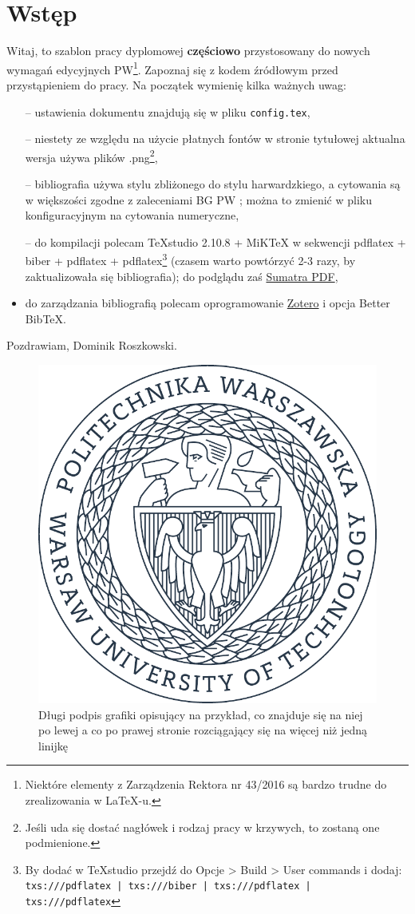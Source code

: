 \chapter{Wstęp}
Witaj, to szablon pracy dyplomowej \textbf{częściowo} przystosowany do nowych wymagań edycyjnych PW\footnote{Niektóre elementy z Zarządzenia Rektora nr 43/2016 są bardzo trudne do zrealizowania w \LaTeX-u.}. Zapoznaj się z kodem źródłowym przed przystąpieniem do pracy. Na początek wymienię kilka ważnych uwag:

\begin{itemize}
	\item[--] ustawienia dokumentu znajdują się w pliku \texttt{config.tex},
	\item[--] niestety ze względu na użycie płatnych fontów w stronie tytułowej aktualna wersja używa plików .png\footnote{Jeśli uda się dostać nagłówek i rodzaj pracy w krzywych, to zostaną one podmienione.},
	\item[--] bibliografia używa stylu zbliżonego do stylu harwardzkiego\parencite{ogata2010modern}, a cytowania są w większości zgodne z zaleceniami BG PW \parencite{linh2002line}; można to zmienić w pliku konfiguracyjnym\parencite[Some kind of post note]{DUMMY:1} na cytowania numeryczne,
	\item[--] do kompilacji polecam TeXstudio 2.10.8 + MiKTeX w sekwencji pdflatex + biber + pdflatex + pdflatex\footnote{By dodać w TeXstudio przejdź do Opcje > Build > User commands i dodaj: \texttt{txs:///pdflatex | txs:///biber | txs:///pdflatex | txs:///pdflatex}} (czasem warto powtórzyć 2-3 razy, by zaktualizowała się bibliografia); do podglądu zaś \href{https://www.sumatrapdfreader.org/}{Sumatra PDF},
	\item do zarządzania bibliografią polecam oprogramowanie \href{https://www.zotero.org/}{Zotero} i opcja Better BibTeX.
\end{itemize}

\begin{flushright}
	Pozdrawiam, Dominik Roszkowski.
\end{flushright}

\begin{figure}[h] %
\centering
\includegraphics[width=0.6\linewidth]{img/PW_logo}
\caption[Krótki podpis grafiki]{Długi podpis grafiki opisujący na przykład, co znajduje się na niej po lewej a co po prawej stronie rozciągający się na więcej niż jedną linijkę}
\label{fig:PW_logo}
\end{figure}

